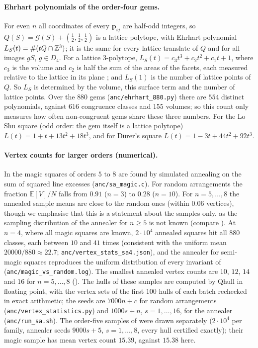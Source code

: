 \paragraph{Ehrhart polynomials of the order-four gems.}
\label{sec:ehrhart}
For even $n$ all coordinates of every $\mathbf p_{ij}$ are half-odd integers, so $Q(S)=\mathcal G(S)+(\frac12,\frac12,\frac12)$ is a lattice polytope, with Ehrhart polynomial $L_S(t)=\#(tQ\cap\mathbb{Z}^3)$; it is the same for every lattice translate of $Q$ and for all images $gS$, $g\in D_4$.
For a lattice $3$-polytope, $L_S(t)=c_3t^3+c_2t^2+c_1t+1$, where $c_3$ is the volume and $c_2$ is half the sum of the areas of the facets, each measured relative to the lattice in its plane \cite[Ch.~3 and~5]{beck2015computing}; and $L_S(1)$ is the number of lattice points of $Q$.
So $L_S$ is determined by the volume, this surface term and the number of lattice points.
Over the $880$ gems (\texttt{anc/ehrhart\_880.py}) there are $554$ distinct polynomials, against $616$ congruence classes and $155$ volumes; so this count only measures how often non-congruent gems share these three numbers.
For the Lo Shu square (odd order: the gem itself is a lattice polytope) $L(t)=1+t+13t^2+18t^3$, and for D\"urer's square $L(t)=1-3t+44t^2+92t^3$.

\paragraph{Vertex counts for larger orders (numerical).}
\label{sec:vertexstats}
In  the magic squares of orders $5$ to $8$ are found by simulated annealing on the sum of squared line excesses (\texttt{anc/sa\_magic.c}).
For random arrangements the fraction $\mathbb E[V]/N$ falls from $0.91$ ($n=3$) to $0.28$ ($n=10$).
For $n=5,\dots,8$ the annealed sample means are close to the random ones (within $0.06$ vertices), though we emphasise that this is a statement about the samples only, as the sampling distribution of the annealer for $n\ge5$ is not known (compare \cite{pinn1998number}).
At $n=4$, where all magic squares are known, $2\cdot10^4$ annealed squares hit all $880$ classes, each between $10$ and $41$ times (consistent with the uniform mean $20000/880\approx22.7$; \texttt{anc/vertex\_stats\_sa4.json}), and the annealer for semi-magic squares reproduces the uniform distribution of every invariant of  (\texttt{anc/magic\_vs\_random.log}).
The smallest annealed vertex counts are $10$, $12$, $14$ and $16$ for $n=5,\dots,8$ ().
The hulls of these samples are computed by Qhull in floating point, with the vertex sets of the first $100$ hulls of each batch rechecked in exact arithmetic; the seeds are $7000n+c$ for random arrangements (\texttt{anc/vertex\_statistics.py}) and $1000s+n$, $s=1,\dots,16$, for the annealer (\texttt{anc/run\_sa.sh}).
The order-five samples of  were drawn separately ($2\cdot10^4$ per family, annealer seeds $9000s+5$, $s=1,\dots,8$, every hull certified exactly); their magic sample has mean vertex count $15.39$, against $15.38$ here.

